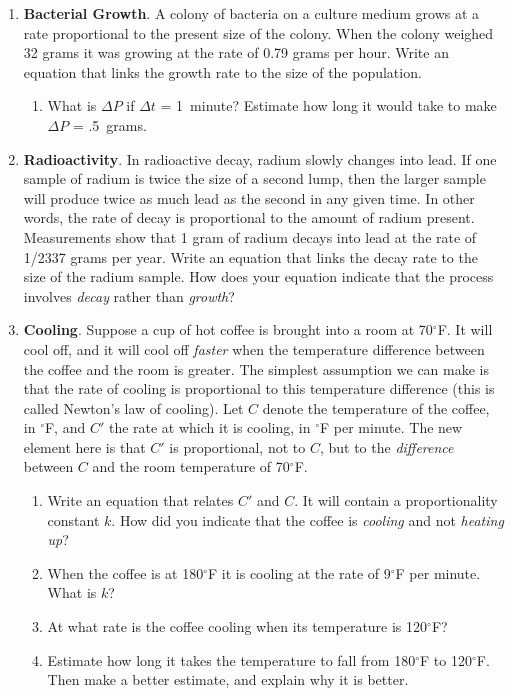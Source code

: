 \begin{enumerate}
\begin{enumerate}
\end{enumerate}
\item {\bf Bacterial Growth}. A colony of
bacteria on a culture medium grows at a rate proportional to the
present size of the colony.  When the colony weighed 32 grams it was
growing at the rate of 0.79 grams per hour.  Write an equation that
links the growth rate to the size of the population.

  \begin{enumerate}
  \item What is $\Delta P$ if $\Delta t$ = 1~minute?  Estimate how long
it would take to make $\Delta P$ = .5~grams.


\end{enumerate}
\item {\bf Radioactivity}. In radioactive decay,
radium slowly changes into lead.  If one sample of radium is twice the
size of a second lump, then the larger sample will produce twice as
much lead as the second in any given time.  In other words, the rate
of decay is proportional to the amount of radium present.
Measurements show that 1 gram of radium decays into lead at the rate
of 1/2337 grams per year.  Write an equation that links the decay rate
to the size of the radium sample.  How does your equation indicate
that the process involves {\em decay\/} rather than {\em growth}?


\item {\bf Cooling}.\label{`cooling'} Suppose a cup of
hot coffee is brought into a room at 70$^{\circ}$F.  It will cool off,
and it will cool off {\em faster\/} when the temperature difference
between the coffee and the room is greater.  The simplest assumption
we can make is that the rate of cooling is proportional to this
temperature difference (this is called Newton's law of
cooling). Let $C$
denote the temperature of the coffee, in $^{\circ}$F, and $C'$ the
rate at which it is cooling, in $^{\circ}$F per minute.  The new
element here is that $C'$ is proportional, not to $C$, but to the {\em
  difference\/} between $C$ and the room temperature of 70$^{\circ}$F.

  \begin{enumerate}
  \item Write an equation that relates $C'$ and $C$.  It will contain a
proportionality constant $k$.  How did you indicate that the coffee is
{\em cooling\/} and not {\em heating up\/}?

  \item When the coffee is at 180$^{\circ}$F it is cooling at the rate of
9$^{\circ}$F per minute.  What is $k$\/?

  \item At what rate is the coffee cooling when its temperature is
120$^{\circ}$F?

  \item Estimate how long it takes the temperature to fall from
180$^{\circ}$F to 120$^{\circ}$F.  Then make a better estimate, and
explain why it is better.



\end{enumerate}
\end{enumerate}
